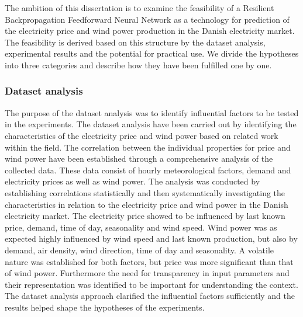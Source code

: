 The ambition of this dissertation is to examine the feasibility of a Resilient Backpropagation Feedforward Neural Network as a technology for prediction of the electricity price and wind power production in the Danish electricity market. The feasibility is derived based on this structure by the dataset analysis, experimental results and the potential for practical use. We divide the hypotheses into three categories and describe how they have been fulfilled one by one.

\subsubsection{Dataset analysis}
The purpose of the dataset analysis was to identify influential factors to be tested in the experiments. The dataset analysis have been carried out by identifying the characteristics of the electricity price and wind power based on related work within the field. The correlation between the individual properties for price and wind power have been established through a comprehensive analysis of the collected data. These data consist of hourly meteorological factors, demand and electricity prices as well as wind power. The analysis was conducted by establishing correlations statistically and then systematically investigating the characteristics in relation to the electricity price and wind power in the Danish electricity market. The electricity price showed to be influenced by last known price, demand, time of day, seasonality and wind speed. Wind power was as expected highly influenced by wind speed and last known production, but also by demand, air density, wind direction, time of day and seasonality. A volatile nature was established for both factors, but price was more significant than that of wind power. Furthermore the need for transparency in input parameters and their representation was identified to be important for understanding the context. The dataset analysis approach clarified the influential factors sufficiently and the results helped shape the hypotheses of the experiments. 
